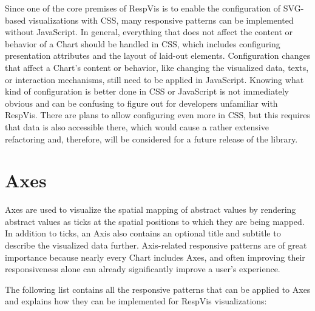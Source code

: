 Since one of the core premises of RespVis is to enable the configuration of SVG-based visualizations with CSS, many responsive patterns can be implemented without JavaScript.
In general, everything that does not affect the content or behavior of a Chart should be handled in CSS, which includes configuring presentation attributes and the layout of laid-out elements.
Configuration changes that affect a Chart's content or behavior, like changing the visualized data, texts, or interaction mechanisms, still need to be applied in JavaScript.
Knowing what kind of configuration is better done in CSS or JavaScript is not immediately obvious and can be confusing to figure out for developers unfamiliar with RespVis.
There are plans to allow configuring even more in CSS, but this requires that data is also accessible there, which would cause a rather extensive refactoring and, therefore, will be considered for a future release of the library.

\section{Axes}
\label{sec:AxesUsage}

Axes are used to visualize the spatial mapping of abstract values by rendering abstract values as ticks at the spatial positions to which they are being mapped.
In addition to ticks, an Axis also contains an optional title and subtitle to describe the visualized data further.
Axis-related responsive patterns are of great importance because nearly every Chart includes Axes, and often improving their responsiveness alone can already significantly improve a user's experience.

The following list contains all the responsive patterns that can be applied to Axes and explains how they can be implemented for RespVis visualizations:

